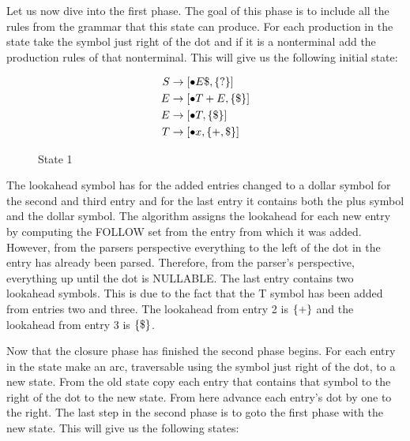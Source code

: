Let us now dive into the first phase. The goal of this phase is to include all the rules from the grammar that this state can produce. For each production in the state take the symbol just right of the dot and if it is a nonterminal add the production rules of that nonterminal. This will give us the following initial state:

\begin{figure}[htp!]
\begin{equation*}
  \begin{split}
      S &\rightarrow [\bullet E\$, \left\{?\right\}]\\
      E &\rightarrow [\bullet T+E, \left\{\$\right\}] \\
      E &\rightarrow [\bullet T, \left\{\$\right\}] \\
      T &\rightarrow [\bullet x, \left\{+,\$\right\}] \\
  \end{split}
\end{equation*}
\caption*{State 1}
\end{figure}

The lookahead symbol has for the added entries changed to a dollar symbol for the second and third entry and for the last entry it contains both the plus symbol and the dollar symbol. The algorithm assigns the lookahead for each new entry by computing the FOLLOW set from the entry from which it was added. However, from the parsers perspective everything to the left of the dot in the entry has already been parsed. Therefore, from the parser's perspective, everything up until the dot is NULLABLE. The last entry contains two lookahead symbols. This is due to the fact that the T symbol has been added from entries two and three. The lookahead from entry 2 is $\left\{+\right\}$ and the lookahead from entry 3 is $\left\{\$\right\}$. 

Now that the closure phase has finished the second phase begins. For each entry in the state make an arc, traversable using the symbol just right of the dot, to a new state. From the old state copy each entry that contains that symbol to the right of the dot to the new state. From here advance each entry's dot by one to the right. The last step in the second phase is to goto the first phase with the new state. This will give us the following states:

